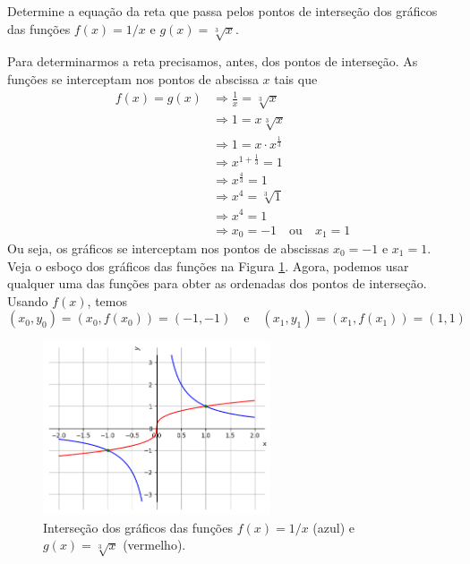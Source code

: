 \documentclass[../main.tex]{subfiles}
\begin{document}
\begin{exeresol}
  Determine a equação da reta que passa pelos pontos de interseção dos gráficos das funções $f(x) = 1/x$ e $g(x) = \sqrt[3]{x}$.\\
  \begin{resol}
  Para determinarmos a reta precisamos, antes, dos pontos de interseção. As funções se interceptam nos pontos de abscissa $x$ tais que
  \begin{align*}
    f(x) = g(x) &\Rightarrow \frac{1}{x} = \sqrt[3]{x}\\
                &\Rightarrow 1 = x\sqrt[3]{x}\\
                &\Rightarrow 1 = x\cdot x^{\frac{1}{3}}\\
                &\Rightarrow x^{1+\frac{1}{3}} = 1\\
                &\Rightarrow x^{\frac{4}{3}} = 1\\
                &\Rightarrow x^4 = \sqrt[3]{1}\\
                &\Rightarrow x^4 = 1\\
                &\Rightarrow x_0 = -1\quad\text{ou}\quad x_1=1
  \end{align*}
  Ou seja, os gráficos se interceptam nos pontos de abscissas $x_0 = -1$ e $x_1 = 1$. Veja o esboço dos gráficos das funções na Figura \ref{fig:exeresol_funpot_intersep}. Agora, podemos usar qualquer uma das funções para obter as ordenadas dos pontos de interseção. Usando $f(x)$, temos
  \begin{equation*}
    (x_0, y_0) = (x_0, f(x_0)) = (-1, -1)\quad\text{e}\quad (x_1, y_1) = (x_1, f(x_1)) = (1, 1)
  \end{equation*}

  \begin{figure}[H]
    \centering
    \includegraphics[width=0.6\textwidth]{fig_func/fig_exeresol_funpot_intersep}
    \caption{Interseção dos gráficos das funções $f(x) = 1/x$ (azul) e $g(x) = \sqrt[3]{x}$ (vermelho).}
    \label{fig:exeresol_funpot_intersep}
  \end{figure}


\end{resol}
\end{exeresol}
\end{document}
